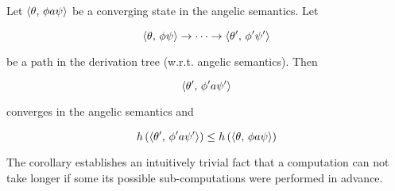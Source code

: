\begin{corollary}
  \label{cor:corollary}
  Let $\langle \theta,\,\phi a \psi \rangle$ be a converging state in the angelic semantics. Let

  \[
  \langle \theta,\,\phi\psi \rangle\to\dots\to\langle \theta^\prime,\,\phi^\prime\psi^\prime \rangle
  \]

  be a path in the derivation tree (w.r.t. angelic semantics). Then

  \[
  \langle \theta^\prime,\,\phi^\prime a \psi^\prime \rangle
  \]

  converges in the angelic semantics and

  \[
  h\,(\langle \theta^\prime,\,\phi^\prime a \psi^\prime \rangle)\le h\,(\langle \theta,\,\phi a \psi \rangle)
  \]  
\end{corollary}

The corollary establishes an intuitively trivial fact that a computation can not take longer if some its possible sub-computations were
performed in advance.

